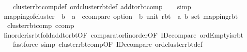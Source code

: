 \begin{isabellebody}
%
\isadelimproof
\ \ %
\endisadelimproof
%
\isatagproof
{}\isamarkupfalse%
\ cluster{\isacharunderscore}{\kern0pt}rbt{\isacharunderscore}{\kern0pt}comp{\isacharunderscore}{\kern0pt}def\ ord{\isachardot}{\kern0pt}cluster{\isacharunderscore}{\kern0pt}rbt{\isacharunderscore}{\kern0pt}def\ add{\isacharunderscore}{\kern0pt}to{\isacharunderscore}{\kern0pt}rbt{\isacharunderscore}{\kern0pt}comp\isanewline
\ \ \isamarkupfalse%
\ simp%
\endisatagproof
{\isafoldproof}%
%
\isadelimproof
\isanewline
%
\endisadelimproof
\isanewline
{}\isamarkupfalse%
\isanewline
\isanewline
{}\isamarkupfalse%
\isanewline
\isanewline
{}\isamarkupfalse%
\ mapping{\isacharunderscore}{\kern0pt}of{\isacharunderscore}{\kern0pt}cluster\ {\isacharcolon}{\kern0pt}{\isacharcolon}{\kern0pt}\ {\isachardoublequoteopen}{\isacharparenleft}{\kern0pt}{\isacharprime}{\kern0pt}b\ {\isasymRightarrow}\ {\isacharprime}{\kern0pt}a\ {\isacharcolon}{\kern0pt}{\isacharcolon}{\kern0pt}\ ccompare\ option{\isacharparenright}{\kern0pt}\ {\isasymRightarrow}\ {\isacharparenleft}{\kern0pt}{\isacharprime}{\kern0pt}b{\isacharcomma}{\kern0pt}\ unit{\isacharparenright}{\kern0pt}\ rbt\ {\isasymRightarrow}\ {\isacharparenleft}{\kern0pt}{\isacharprime}{\kern0pt}a{\isacharcomma}{\kern0pt}\ {\isacharprime}{\kern0pt}b\ set{\isacharparenright}{\kern0pt}\ mapping{\isacharunderscore}{\kern0pt}rbt{\isachardoublequoteclose}\ \isanewline
\ \ {\isachardoublequoteopen}cluster{\isacharunderscore}{\kern0pt}rbt{\isacharunderscore}{\kern0pt}comp\ ccomp{\isachardoublequoteclose}\isanewline
%
\isadelimproof
\ \ %
\endisadelimproof
%
\isatagproof
{}\isamarkupfalse%
\ linorder{\isachardot}{\kern0pt}is{\isacharunderscore}{\kern0pt}rbt{\isacharunderscore}{\kern0pt}fold{\isacharunderscore}{\kern0pt}add{\isacharunderscore}{\kern0pt}to{\isacharunderscore}{\kern0pt}rbt{\isacharbrackleft}{\kern0pt}OF\ comparator{\isachardot}{\kern0pt}linorder{\isacharbrackleft}{\kern0pt}OF\ ID{\isacharunderscore}{\kern0pt}ccompare{\isacharprime}{\kern0pt}{\isacharbrackright}{\kern0pt}\ ord{\isachardot}{\kern0pt}Empty{\isacharunderscore}{\kern0pt}is{\isacharunderscore}{\kern0pt}rbt{\isacharbrackright}{\kern0pt}\isanewline
\ \ \isamarkupfalse%
\ {\isacharparenleft}{\kern0pt}fastforce\ simp{\isacharcolon}{\kern0pt}\ cluster{\isacharunderscore}{\kern0pt}rbt{\isacharunderscore}{\kern0pt}comp{\isacharbrackleft}{\kern0pt}OF\ ID{\isacharunderscore}{\kern0pt}ccompare{\isacharprime}{\kern0pt}{\isacharbrackright}{\kern0pt}\ ord{\isachardot}{\kern0pt}cluster{\isacharunderscore}{\kern0pt}rbt{\isacharunderscore}{\kern0pt}def{\isacharparenright}{\kern0pt}%

\end{isabellebody}
